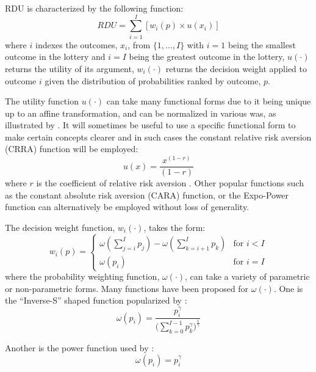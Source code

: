 \documentclass[../main.tex]{subfiles}
\begin{document}
RDU is characterized by the following function:
\begin{equation}
	\label{eq2:RDU}
	RDU = \sum_{i=1}^{I} \left[ w_i(p) \times u(x_i) \right]
\end{equation}
\noindent where $i$ indexes the outcomes, $x_i$, from $\{1,\ldots,I\}$ with $i=1$ being the smallest outcome in the lottery and $i=I$ being the greatest outcome in the lottery, $u(\cdot)$ returns the utility of its argument, $w_i(\cdot)$ returns the decision weight applied to outcome $i$ given the distribution of probabilities ranked by outcome, $p$.

The utility function $u(\cdot)$ can take many functional forms due to it being unique up to an affine transformation, and can be normalized in various was, as illustrated by \textcite{Hey1994}.
It will sometimes be useful to use a specific functional form to make certain concepts clearer and in such cases the constant relative risk aversion (CRRA) function will be employed:
\begin{equation}
	\label{eq2:CRRA}
	u(x) = \frac{x^{(1-r)}}{(1-r)}
\end{equation}
\noindent where $r$ is the coefficient of relative risk aversion \parencite{Pratt1964}.
Other popular functions such as the constant absolute risk aversion (CARA) function, or the Expo-Power function \parencite{Saha1993} can alternatively be employed without loss of generality.

The decision weight function, $w_i(\cdot)$, takes the form:
\begin{equation}
	\label{eq2:dweight}
	w_i(p) =
	\begin{cases}
		\omega\left(\displaystyle\sum_{j=i}^I p_j\right) - \omega\left(\displaystyle\sum_{k=i+1}^I p_k\right) & \text{for } i<I \\
		\omega(p_i) & \text{for } i = I
	\end{cases}
\end{equation}
\noindent where the probability weighting function, $\omega(\cdot)$, can take a variety of parametric or non-parametric forms.
Many functions have been proposed for $\omega(\cdot)$.
One is the \enquote{Inverse-S} shaped function popularized by \textcite{Tversky1992}:
\begin{equation}
	\label{eq2:pw:kahneman}
	\omega(p_i) = \frac{p_i^\gamma}{\biggl(\sum\limits_{k=0}^{I-1} p_k^\gamma\biggr)^{ \frac{1}{\gamma} } }
\end{equation}

\noindent Another is the power function used by \textcite{Quiggin1982}:
\begin{equation}
	\label{eq2:pw:quiggin}
	\omega(p_i)=p_i^\gamma
\end{equation}
\end{document}

